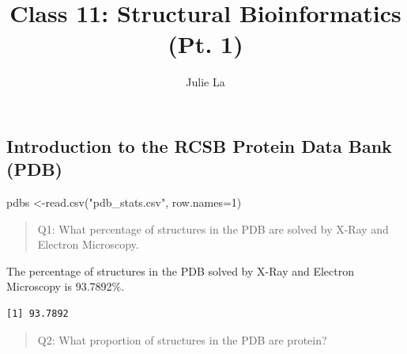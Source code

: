 \documentclass[
  letterpaper,
  DIV=11,
  numbers=noendperiod]{scrartcl}
\title{Class 11: Structural Bioinformatics (Pt. 1)}
\author{Julie La}
\date{}
\newenvironment{Shaded}{\begin{snugshade}}{\end{snugshade}}
\newcommand{\AttributeTok}[1]{\textcolor[rgb]{0.40,0.45,0.13}{#1}}
\newcommand{\ConstantTok}[1]{\textcolor[rgb]{0.56,0.35,0.01}{#1}}
\newcommand{\DecValTok}[1]{\textcolor[rgb]{0.68,0.00,0.00}{#1}}
\newcommand{\FunctionTok}[1]{\textcolor[rgb]{0.28,0.35,0.67}{#1}}
\newcommand{\NormalTok}[1]{\textcolor[rgb]{0.00,0.23,0.31}{#1}}
\newcommand{\OtherTok}[1]{\textcolor[rgb]{0.00,0.23,0.31}{#1}}
\newcommand{\SpecialCharTok}[1]{\textcolor[rgb]{0.37,0.37,0.37}{#1}}
\newcommand{\StringTok}[1]{\textcolor[rgb]{0.13,0.47,0.30}{#1}}
\begin{document}
\maketitle


\subsection{Introduction to the RCSB Protein Data Bank
(PDB)}\label{introduction-to-the-rcsb-protein-data-bank-pdb}

\begin{Shaded}
\begin{Highlighting}[]
\NormalTok{pdbs }\OtherTok{\textless{}{-}}\FunctionTok{read.csv}\NormalTok{(}\StringTok{"pdb\_stats.csv"}\NormalTok{, }\AttributeTok{row.names=}\DecValTok{1}\NormalTok{)}
\end{Highlighting}
\end{Shaded}

\begin{quote}
Q1: What percentage of structures in the PDB are solved by X-Ray and
Electron Microscopy.
\end{quote}

The percentage of structures in the PDB solved by X-Ray and Electron
Microscopy is 93.7892\%.

\begin{Shaded}
\end{Shaded}

\begin{verbatim}
[1] 93.7892
\end{verbatim}

\begin{quote}
Q2: What proportion of structures in the PDB are protein?
\end{quote}
\end{document}
